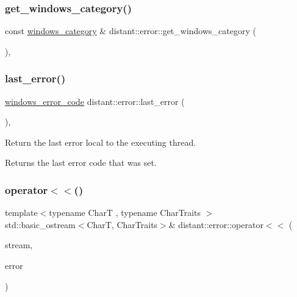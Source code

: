 \subsubsection{\texorpdfstring{get\+\_\+windows\+\_\+category()}{get\_windows\_category()}}
{\footnotesize\ttfamily const \mbox{\hyperlink{classdistant_1_1error_1_1windows__category}{windows\+\_\+category}} \& distant\+::error\+::get\+\_\+windows\+\_\+category (\begin{DoxyParamCaption}{ }\end{DoxyParamCaption})\hspace{0.3cm}{\ttfamily [inline]}, {\ttfamily [noexcept]}}

\mbox{\label{namespacedistant_1_1error_aaaf1a34cba6373db33d2c27d8876c0b2}} 
\subsubsection{\texorpdfstring{last\+\_\+error()}{last\_error()}}
{\footnotesize\ttfamily \mbox{\hyperlink{classdistant_1_1error_1_1windows__error__code}{windows\+\_\+error\+\_\+code}} distant\+::error\+::last\+\_\+error (\begin{DoxyParamCaption}{ }\end{DoxyParamCaption})\hspace{0.3cm}{\ttfamily [inline]}, {\ttfamily [noexcept]}}



Return the last error local to the executing thread. 

\begin{DoxyReturn}{Returns}
the last error code that was set. 
\end{DoxyReturn}
\mbox{\label{namespacedistant_1_1error_a48665acc974b937ffe1c2addb0c8777a}} 
\subsubsection{\texorpdfstring{operator$<$$<$()}{operator<<()}\hspace{0.1cm}{\footnotesize\ttfamily [1/2]}}
{\footnotesize\ttfamily template$<$typename CharT , typename Char\+Traits $>$ \\
std\+::basic\+\_\+ostream$<$CharT, Char\+Traits$>$\& distant\+::error\+::operator$<$$<$ (\begin{DoxyParamCaption}\item[{std\+::basic\+\_\+ostream$<$ CharT, Char\+Traits $>$ \&}]{stream,  }\item[{const \mbox{\hyperlink{classdistant_1_1error_1_1windows__error__code}{windows\+\_\+error\+\_\+code}} \&}]{error }\end{DoxyParamCaption})}



